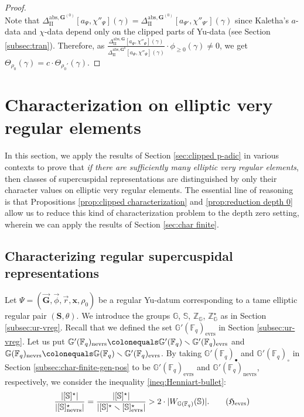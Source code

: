 \documentclass{amsart}
\newcommand{\abs}{\mathrm{abs}}
\newcommand{\evrs}{\mathrm{evrs}}
\newcommand{\nevrs}{\mathrm{nevrs}}
\newcommand{\x}{\mathbf{x}}
\newcommand{\F}{\mathbb{F}}
\newcommand{\bbS}{\mathbb{S}}
\newcommand{\bbG}{\mathbb{G}}
\newcommand{\bfG}{\mathbf{G}}
\newcommand{\bbZ}{\mathbb{Z}}
\newcommand{\bfS}{\mathbf{S}}
\newcommand{\II}{\mathrm{II}}
\theoremstyle{plain}
\theoremstyle{definition}
\theoremstyle{remark}
\theoremstyle{theorem}
\begin{document}
\begin{proof}
\begin{equation*}
    \end{equation*}
Note that $\Delta_{\II}^{\abs,\bfG^{(0)}}[a_{\Psi},\chi''_{\Psi}](\gamma)=\Delta_{\II}^{\abs,\bfG^{(0)}}[a_{\Psi'},\chi''_{\Psi'}](\gamma)$ since Kaletha's $a$-data and $\chi$-data depend only on the clipped parts of Yu-data (see Section \ref{subsec:tran}).
Therefore, as $\frac{\Delta_{\II}^{\abs,\bfG}[a_{\Psi},\chi''_{\Psi}](\gamma)}{\Delta_{\II}^{\abs,\bfG^{0}}[a_{\Psi},\chi''_{\Psi}](\gamma)}\cdot\phi_{\geq0}(\gamma) \neq 0$, we get $\Theta_{\rho_0}(\gamma) = c \cdot \Theta_{\rho_0'}(\gamma)$.
\end{proof}

\section{Characterization on elliptic very regular elements}\label{sec:sc characterization}

In this section, we apply the results of Section \ref{sec:clipped p-adic} in various contexts to prove that \textit{if there are sufficiently many elliptic very regular elements}, then classes of supercuspidal representations are distinguished by only their character values on elliptic very regular elements. The essential line of reasoning is that Propositions \ref{prop:clipped characterization} and \ref{prop:reduction depth 0} allow us to reduce this kind of characterization problem to the depth zero setting, wherein we can apply the results of Section \ref{sec:char finite}.

\subsection{Characterizing regular supercuspidal representations}\label{subsec:regsc-characterization}

Let $\Psi=(\vec{\bfG},\vec{\phi},\vec{r},\x,\rho_{0})$ be a regular Yu-datum corresponding to a tame elliptic regular pair $(\bfS,\theta)$.
We introduce the groups $\bbG$, $\bbS$, $\bbZ_{\bbG}$, $\bbZ^{\star}_{\bbG}$ as in Section \ref{subsec:ur-vreg}.
Recall that we defined the set $\bbG'(\F_{q})_{\evrs}$ in Section \ref{subsec:ur-vreg}.
Let us put $\bbG'(\F_{q})_{\nevrs}\colonequals \bbG'(\F_{q})\smallsetminus\bbG'(\F_{q})_{\evrs}$ and $\bbG(\F_{q})_{\nevrs}\colonequals \bbG(\F_{q})\smallsetminus\bbG'(\F_{q})_{\evrs}$.
By taking $\bbG'(\F_{q})_{\bullet}$ and $\bbG'(\F_{q})_{\circ}$ in Section \ref{subsec:char-finite-gen-pos} to be $\bbG'(\F_{q})_{\evrs}$ and $\bbG'(\F_{q})_{\nevrs}$, respectively, we consider the inequality \eqref{ineq:Henniart-bullet}:
\[\label{ineq:Henniart-evrs}
\frac{|[\bbS]^{\star}|}{|[\bbS]^{\star}_{\nevrs}|} 
=
\frac{|[\bbS]^{\star}|}{|[\bbS]^{\star} \smallsetminus [\bbS]^{\star}_\evrs|} 
> 2\cdot|W_{\bbG(\F_{q})}(\bbS)|.
\tag{$\mathfrak{H}_{\evrs}$}
\]
\end{document}

